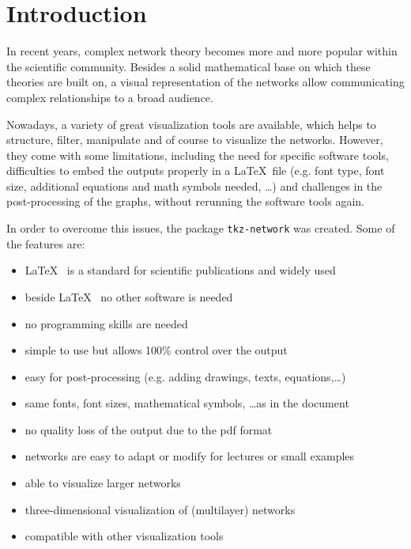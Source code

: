 \documentclass[a4paper,twosided,notoc]{tufte-book}
\newcommand{\doccls}[1]{\texttt{#1}}%
\newcommand{\pkg}{\doccls{tkz-network}\xspace}
\begin{document}
\begin{fullwidth}
\tableofcontents
\end{fullwidth}

\cleardoublepage
\chapter{Introduction}

In recent years, complex network theory becomes more and more popular within the scientific community. Besides a solid mathematical base on which these theories are built on, a visual representation of the networks allow communicating complex relationships to a broad audience.

Nowadays, a variety of great visualization tools are available, which helps to structure, filter, manipulate and of course to visualize the networks. However, they come with some limitations, including the need for specific software tools, difficulties to embed the outputs properly in a \LaTeX~file (e.g. font type, font size, additional equations and math symbols needed, \dots) and challenges in the post-processing of the graphs, without rerunning the software tools again.

In order to overcome this issues, the package \pkg was created. Some of the features are:

\begin{itemize}
\item \LaTeX~ is a standard for scientific publications and widely used
\item beside \LaTeX~ no other software is needed
\item no programming skills are needed
\item simple to use but allows 100\% control over the output
\item easy for post-processing (e.g. adding drawings, texts, equations,\dots)
\item same fonts, font sizes, mathematical symbols, \dots as in the document
\item no quality loss of the output due to the pdf format
\item networks are easy to adapt or modify for lectures or small examples
\item able to visualize larger networks
\item three-dimensional visualization of (multilayer) networks
\item compatible with other visualization tools
\end{itemize}
\newpage
\end{document}
